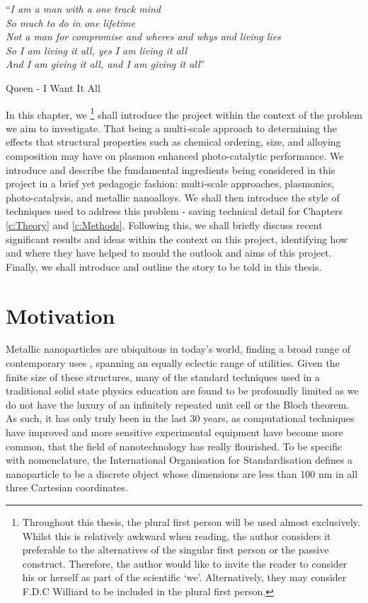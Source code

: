 \noindent\enquote{\itshape I am a man with a one track mind\\
    So much to do in one lifetime\\
    Not a man for compromise and wheres and whys and living lies\\
    So I am living it all, yes I am living it all\\
    And I am giving it all, and I am giving it all}\bigbreak

\hfill Queen - I Want It All

\vspace*{0.05\textheight}

In this chapter, we \footnote{Throughout this thesis, the plural first person will be used almost exclusively. Whilst this is relatively awkward when reading, the author considers it preferable to the alternatives of the singular first person or the passive construct. Therefore, the author would like to invite the reader to consider his or herself as part of the scientific `we'. Alternatively, they may consider F.D.C Williard to be included in the plural first person.} shall introduce the project within the context of the problem we aim to investigate. That being a multi-scale approach to determining the effects that structural properties such as chemical ordering, size, and alloying composition may have on plasmon enhanced photo-catalytic performance. We introduce and describe the fundamental ingredients being considered in this project in a brief yet pedagogic fashion: multi-scale approaches, plasmonics, photo-catalysis, and metallic nanoalloys. We shall then introduce the style of techniques used to address this problem - saving technical detail for Chapters \ref{c:Theory} and \ref{c:Methods}. Following this, we shall briefly discuss recent significant results and ideas within the context on this project, identifying how and where they have helped to mould the outlook and aims of this project. Finally, we shall introduce and outline the story to be told in this thesis.

\section{Motivation}
\label{Mot}
Metallic nanoparticles are ubiquitous in today's world, finding a broad range of contemporary uses \cite{BioSensors,PlasmonSensing2021,SolarToChem}, spanning an equally eclectic range of utilities. Given the finite size of these structures, many of the standard techniques used in a traditional solid state physics education are found to be profoundly limited as we do not have the luxury of an infinitely repeated unit cell or the Bloch theorem. As such, it has only truly been in the last 30 years, as computational techniques have improved and more sensitive experimental equipment have become more common, that the field of nanotechnology has really flourished. To be specific with nomenclature, the International Organisation for Standardisation defines a nanoparticle to be a discrete object whose dimensions are less than 100 nm in all three Cartesian coordinates.

